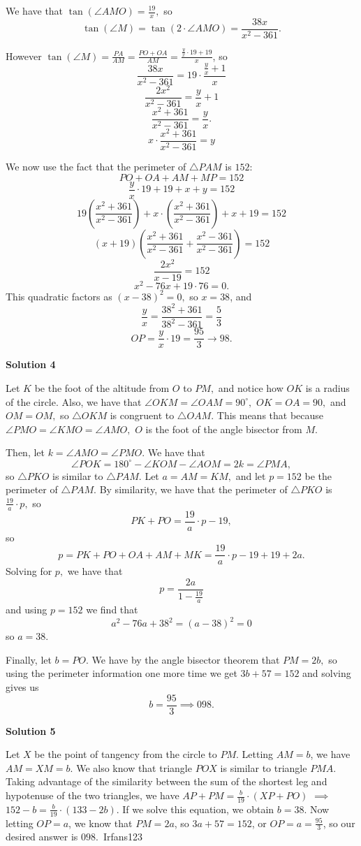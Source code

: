 \begin{enumerate}
 We have that $\tan(\angle AMO)=\frac{19}{x},$ so
 \[\tan(\angle M)=\tan (2\cdot \angle AMO)=\frac{38x}{x^{2}-361}.\]

 However $\tan(\angle M)=\frac{PA}{AM}=\frac{PO+OA}{AM}=\frac{\frac{y}{x}\cdot 19 + 19}{x}$, so
 \[\frac{38x}{x^{2}-361}=19\cdot \frac{\frac{y}{x}+1}{x}\]
 \[\frac{2x^{2}}{x^{2}-361}=\frac{y}{x}+1\]
 \[\frac{x^{2}+361}{x^{2}-361}=\frac{y}{x}.\]
 \[x\cdot \frac{x^{2}+361}{x^{2}-361}=y\]

 We now use the fact that the perimeter of $\triangle PAM$ is $152$:
 \[PO+OA+AM+MP=152\]
 \[\frac{y}{x}\cdot 19+19+x+y=152\]
 \[19\left(\frac{x^{2}+361}{x^{2}-361}\right)+x\cdot \left(\frac{x^{2}+361}{x^{2}-361}\right)+x+19=152\]
 \[(x+19)\left(\frac{x^{2}+361}{x^{2}-361}+\frac{x^{2}-361}{x^{2}-361}\right)=152\]
 \[\frac{2x^{2}}{x-19}=152\]
 \[x^{2}-76x+19\cdot 76=0.\]This quadratic factors as $(x-38)^{2}=0,$ so $x=38$, and 
 \[\frac{y}{x}=\frac{38^{2}+361}{38^{2}-361}=\frac{5}{3}\]
 \[OP=\frac{y}{x}\cdot 19=\frac{95}{3}\to \boxed{98.}\]




\textbf{Solution 4}

Let $K$ be the foot of the altitude from $O$ to $PM,$ and notice how $OK$ is a radius of the circle. Also, we have that $\angle OKM=\angle OAM=90^\circ,$ $OK=OA=90,$ and $OM=OM,$ so $\triangle OKM$ is congruent to $\triangle OAM.$ This means that because $\angle PMO=\angle KMO=\angle AMO,$ $O$ is the foot of the angle bisector from $M.$ 

 Then, let $k=\angle AMO=\angle PMO.$ We have that 
 \[\angle POK=180^\circ-\angle KOM-\angle AOM=2k=\angle PMA,\]so $\triangle PKO$ is similar to $\triangle PAM.$ Let $a=AM=KM,$ and let $p=152$ be the perimeter of $\triangle PAM.$ By similarity, we have that the perimeter of $\triangle PKO$ is $\frac{19}{a}\cdot p,$ so
 \[PK+PO=\dfrac{19}{a}\cdot p-19,\]so
 \[p=PK+PO+OA+AM+MK=\dfrac{19}{a}\cdot p-19+19+2a.\]Solving for $p,$ we have that
 \[p=\dfrac{2a}{1-\frac{19}{a}}\]and using $p=152$ we find that 
 \[a^2-76a+38^2=(a-38)^2=0\]so $a=38.$ 

 Finally, let $b=PO.$ We have by the angle bisector theorem that $PM=2b,$ so using the perimeter information one more time we get $3b+57=152$ and solving gives us
 \[b=\dfrac{95}{3}\implies \boxed{098}.\]




\textbf{Solution 5}

Let $X$ be the point of tangency from the circle to $PM$. Letting $AM=b$, we have $AM=XM=b$. We also know that triangle $POX$ is similar to triangle $PMA$. Taking advantage of the similarity between the sum of the shortest leg and hypotenuse of the two triangles, we have $AP+PM=\frac{b}{19} \cdot (XP+PO)$ $\implies$ $152-b=\frac{b}{19} \cdot (133-2b)$. If we solve this equation, we obtain $b=38$. Now letting  $OP=a$, we know that $PM=2a$, so $3a+57=152$, or $OP=a= \frac{95}{3}$, so our desired answer is $\boxed{098}$.~Irfans123


\end{enumerate}
